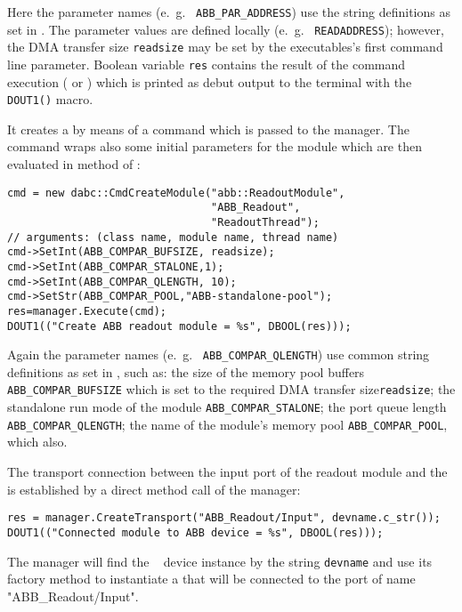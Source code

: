 \begin{compactenum}
Here the parameter names (e.~g.~ {\tt ABB\_PAR\_ADDRESS}) use
the string definitions as set in . The
parameter values are defined locally (e.~g.~ {\tt READADDRESS});
however, the DMA transfer size {\tt readsize} may be set by
the executables's first command line parameter. 
Boolean variable {\tt res} contains the result 
of the command execution ( or ) which is
printed as debut output to the terminal with the {\tt DOUT1()} macro. 

\item It creates a  by means of a command
 which is passed to the manager. The 
command wraps also some initial
parameters for the module which are then evaluated in 
method  of :

\begin{small}
\begin{verbatim}
cmd = new dabc::CmdCreateModule("abb::ReadoutModule",
                                "ABB_Readout", 
                                "ReadoutThread");
// arguments: (class name, module name, thread name)
cmd->SetInt(ABB_COMPAR_BUFSIZE, readsize);
cmd->SetInt(ABB_COMPAR_STALONE,1);
cmd->SetInt(ABB_COMPAR_QLENGTH, 10);
cmd->SetStr(ABB_COMPAR_POOL,"ABB-standalone-pool");
res=manager.Execute(cmd);
DOUT1(("Create ABB readout module = %s", DBOOL(res)));
\end{verbatim}
\end{small}

Again the parameter names (e.~g.~ {\tt ABB\_COMPAR\_QLENGTH}) use
common string definitions as set in , 
such as: 
the size of the memory pool buffers {\tt ABB\_COMPAR\_BUFSIZE} which is
set to the required DMA transfer size{\tt readsize};
the standalone run mode of the module {\tt ABB\_COMPAR\_STALONE};
the port queue length {\tt ABB\_COMPAR\_QLENGTH}; the name of
the module's memory pool {\tt ABB\_COMPAR\_POOL}, which also. 

\item The transport connection between the input port of the readout module and
the  is established by a direct method call of the manager:
\begin{small}
\begin{verbatim}
res = manager.CreateTransport("ABB_Readout/Input", devname.c_str());
DOUT1(("Connected module to ABB device = %s", DBOOL(res)));
\end{verbatim}  
\end{small}
The manager will find the \ABB~ device instance by the string {\tt devname}
and use its factory method  to instantiate a
 that will be connected to the port of name
"ABB\_Readout/Input".


\end{compactenum}
